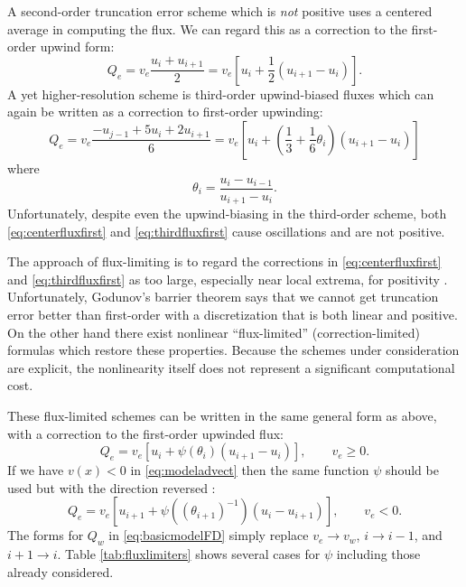 \documentclass[11pt,final]{amsart}%
\begin{document}
A second-order truncation error scheme which is \emph{not} positive uses a centered average in computing the flux.  We can regard this as a correction to the first-order upwind form:
\begin{equation}
Q_e = v_e \frac{u_i+u_{i+1}}{2} = v_e \left[u_i + \frac{1}{2} (u_{i+1} - u_i)\right]. \label{eq:centerfluxfirst}
\end{equation}
A yet higher-resolution scheme is third-order upwind-biased fluxes which can again be written as a correction to first-order upwinding:
\begin{equation}
Q_e = v_e \frac{-u_{j-1} + 5 u_i + 2 u_{i+1}}{6} = v_e \left[u_i + \left(\frac{1}{3}+\frac{1}{6} \theta_i \right) (u_{i+1} - u_i)\right] \label{eq:thirdfluxfirst}
\end{equation}
where
\begin{equation}
\theta_i = \frac{u_{i} - u_{i-1}}{u_{i+1} - u_i}.  \label{eq:thetadefine}
\end{equation}
Unfortunately, despite even the upwind-biasing in the third-order scheme, both \eqref{eq:centerfluxfirst} and \eqref{eq:thirdfluxfirst} cause oscillations and are not positive.

The approach of flux-limiting is to regard the corrections in \eqref{eq:centerfluxfirst} and \eqref{eq:thirdfluxfirst} as too large, especially near local extrema, for positivity \citep[section III.1.1]{HundsdorferVerwer2010}.  Unfortunately, Godunov's barrier theorem \citep[section I.7.1]{HundsdorferVerwer2010} says that we cannot get truncation error better than first-order with a discretization that is both linear and positive.  On the other hand there exist nonlinear ``flux-limited'' (correction-limited) formulas which restore these properties.  Because the schemes under consideration are explicit, the nonlinearity itself does not represent a significant computational cost.

These flux-limited schemes can be written in the same general form as above, with a correction to the first-order upwinded flux:
\begin{equation}
Q_e = v_e \left[u_i + \psi(\theta_i) (u_{i+1} - u_i)\right], \qquad v_e \ge 0. \label{eq:fluxlimiterform}
\end{equation}
If we have $v(x)<0$ in \eqref{eq:modeladvect} then the same function $\psi$ should be used but with the direction reversed \citep[section III.1.1]{HundsdorferVerwer2010}:
\begin{equation}
Q_e = v_e \left[u_{i+1} + \psi\left((\theta_{i+1})^{-1}\right) (u_i - u_{i+1})\right], \qquad v_e < 0. \label{eq:fluxlimiterformreversed}
\end{equation}
The forms for $Q_w$ in \eqref{eq:basicmodelFD} simply replace $v_e \to v_w$, $i\to i-1$, and $i+1\to i$.  Table \ref{tab:fluxlimiters} shows several cases for $\psi$ including those already considered.
\end{document}
